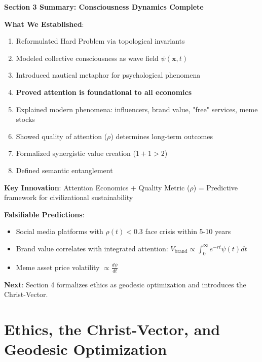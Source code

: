 \documentclass[11pt,a4paper]{article}
\theoremstyle{definition}
\theoremstyle{remark}
\begin{document}
\begin{mdframed}[backgroundcolor=green!10,linewidth=2pt,linecolor=green!70!black]
\textbf{Section 3 Summary: Consciousness Dynamics Complete}

\textbf{What We Established}:
\begin{enumerate}[nosep]
    \item Reformulated Hard Problem via topological invariants
    \item Modeled collective consciousness as wave field \(\psi(\mathbf{x},t)\)
    \item Introduced nautical metaphor for psychological phenomena
    \item \textbf{Proved attention is foundational to all economics}
    \item Explained modern phenomena: influencers, brand value, "free" services, meme stocks
    \item Showed quality of attention (\(\rho\)) determines long-term outcomes
    \item Formalized synergistic value creation (\(1+1>2\)) 
    \item Defined semantic entanglement
\end{enumerate}

\textbf{Key Innovation}:
Attention Economics + Quality Metric (\(\rho\)) = Predictive framework for civilizational sustainability

\textbf{Falsifiable Predictions}:
\begin{itemize}[nosep]
    \item Social media platforms with \(\rho(t) < 0.3\) face crisis within 5-10 years
    \item Brand value correlates with integrated attention: \(V_{\text{brand}} \propto \int_0^\infty e^{-rt} \psi(t) dt\)
    \item Meme asset price volatility \(\propto \frac{d\psi}{dt}\)
\end{itemize}

\textbf{Next}: Section 4 formalizes ethics as geodesic optimization and introduces the Christ-Vector.
\end{mdframed}


\section{Ethics, the Christ-Vector, and Geodesic Optimization}
\end{document}
